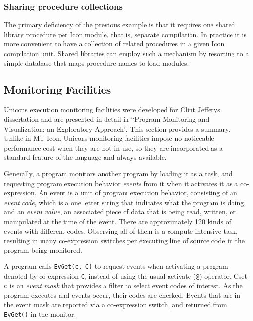 \subsubsection{Sharing procedure collections}

The primary deficiency of the previous example is that it requires one
shared library procedure per Icon module, that is, separate
compilation. In practice it is more convenient to have a collection of
related procedures in a given Icon compilation unit. Shared libraries
can employ such a mechanism by resorting to a simple database that maps
procedure names to load modules. 

\subsection{Monitoring Facilities}

Unicon{\textquotesingle}s execution monitoring facilities were developed
for Clint Jeffery{\textquotesingle}s dissertation and are presented in
detail in {\textquotedblleft}Program Monitoring and Visualization: an
Exploratory Approach{\textquotedblright}. This section provides a
summary. Unlike in MT Icon, Unicon{\textquotesingle}s monitoring
facilities impose no noticeable performance cost when they are not in
use, so they are incorporated as a standard feature of the language and
always available.

Generally, a program monitors another program by loading it as a task,
and requesting program execution behavior \textit{events} from it when
it activates it as a co-expression. An event is a unit of program
execution behavior, consisting of an \textit{event code}, which is a
one letter string that indicates what the program is doing, and an
\textit{event value}, an associated piece of data that is being read,
written, or manipulated at the time of the event. There are
approximately 120 kinds of events with different codes. Observing all
of them is a compute-intensive task, resulting in many co-expression
switches per executing line of source code in the program being
monitored.

A program calls \texttt{EvGet(c, C)} to request events when activating a
program denoted by co-expression \texttt{C}, instead of using the usual
activate (\texttt{@}) operator. Cset \texttt{c} is an \textit{event
mask} that provides a filter to select event codes of interest. As
the program executes and events occur, their codes are checked.
Events that are in the event mask are reported via a co-expression switch,
and returned from \texttt{EvGet()} in the monitor.

